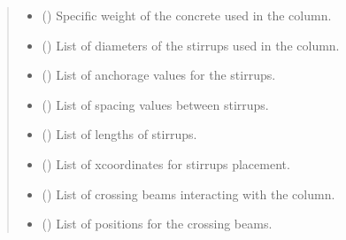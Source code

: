 \documentclass[a4paper,10pt,english]{sphinxmanual}
\begin{document}
\begin{fulllineitems}
\begin{quote}
\begin{description}
\begin{itemize}
\item {} 
\sphinxAtStartPar
{} () \textendash{} Specific weight of the concrete used in the column.

\item {} 
\sphinxAtStartPar
{} (\sphinxstyleliteralemphasis{\sphinxupquote{, }}) \textendash{} List of diameters of the stirrups used in the column.

\item {} 
\sphinxAtStartPar
{} (\sphinxstyleliteralemphasis{\sphinxupquote{, }}) \textendash{} List of anchorage values for the stirrups.

\item {} 
\sphinxAtStartPar
{} (\sphinxstyleliteralemphasis{\sphinxupquote{, }}) \textendash{} List of spacing values between stirrups.

\item {} 
\sphinxAtStartPar
{} (\sphinxstyleliteralemphasis{\sphinxupquote{, }}) \textendash{} List of lengths of stirrups.

\item {} 
\sphinxAtStartPar
{} (\sphinxstyleliteralemphasis{\sphinxupquote{, }}) \textendash{} List of x\sphinxhyphen{}coordinates for stirrups placement.

\item {} 
\sphinxAtStartPar
{} (\sphinxstyleliteralemphasis{\sphinxupquote{, }}) \textendash{} List of crossing beams interacting with the column.

\item {} 
\sphinxAtStartPar
{} (\sphinxstyleliteralemphasis{\sphinxupquote{, }}) \textendash{} List of positions for the crossing beams.


\end{itemize}
\end{description}
\end{quote}
\end{fulllineitems}
\end{document}
